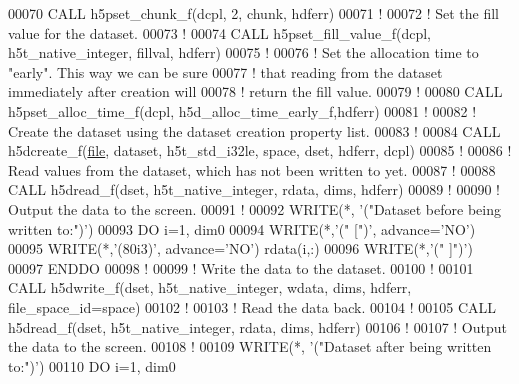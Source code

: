 \begin{DoxyCode}
00070   \textcolor{keyword}{CALL }h5pset\_chunk\_f(dcpl, 2, chunk, hdferr)
00071   \textcolor{comment}{!}
00072   \textcolor{comment}{! Set the fill value for the dataset.}
00073   \textcolor{comment}{!}
00074   \textcolor{keyword}{CALL }h5pset\_fill\_value\_f(dcpl, h5t\_native\_integer, fillval, hdferr)
00075   \textcolor{comment}{!}
00076   \textcolor{comment}{! Set the allocation time to "early".  This way we can be sure}
00077   \textcolor{comment}{! that reading from the dataset immediately after creation will}
00078   \textcolor{comment}{! return the fill value.}
00079   \textcolor{comment}{!}
00080   \textcolor{keyword}{CALL }h5pset\_alloc\_time\_f(dcpl, h5d\_alloc\_time\_early\_f,hdferr)
00081   \textcolor{comment}{!}
00082   \textcolor{comment}{! Create the dataset using the dataset creation property list.}
00083   \textcolor{comment}{!}
00084   \textcolor{keyword}{CALL }h5dcreate\_f(\hyperlink{structfile}{file}, dataset, h5t\_std\_i32le, space, dset, hdferr, dcpl)
00085   \textcolor{comment}{!}
00086   \textcolor{comment}{! Read values from the dataset, which has not been written to yet.}
00087   \textcolor{comment}{!}
00088   \textcolor{keyword}{CALL }h5dread\_f(dset, h5t\_native\_integer, rdata, dims, hdferr)
00089   \textcolor{comment}{!}
00090   \textcolor{comment}{! Output the data to the screen.}
00091   \textcolor{comment}{!}
00092   \textcolor{keyword}{WRITE}(*, \textcolor{stringliteral}{'("Dataset before being written to:")'})
00093   \textcolor{keywordflow}{DO} i=1, dim0
00094      \textcolor{keyword}{WRITE}(*,\textcolor{stringliteral}{'(" [")'}, advance=\textcolor{stringliteral}{'NO'})
00095      \textcolor{keyword}{WRITE}(*,\textcolor{stringliteral}{'(80i3)'}, advance=\textcolor{stringliteral}{'NO'}) rdata(i,:)
00096      \textcolor{keyword}{WRITE}(*,\textcolor{stringliteral}{'(" ]")'})
00097 \textcolor{keywordflow}{  ENDDO}
00098   \textcolor{comment}{!}
00099   \textcolor{comment}{! Write the data to the dataset.}
00100   \textcolor{comment}{!}
00101   \textcolor{keyword}{CALL }h5dwrite\_f(dset, h5t\_native\_integer, wdata, dims, hdferr, file\_space\_id=space)
00102   \textcolor{comment}{!}
00103   \textcolor{comment}{! Read the data back.}
00104   \textcolor{comment}{!}
00105   \textcolor{keyword}{CALL }h5dread\_f(dset, h5t\_native\_integer, rdata, dims, hdferr)
00106   \textcolor{comment}{!}
00107   \textcolor{comment}{! Output the data to the screen.}
00108   \textcolor{comment}{!}
00109   \textcolor{keyword}{WRITE}(*, \textcolor{stringliteral}{'("Dataset after being written to:")'})
00110   \textcolor{keywordflow}{DO} i=1, dim0

\end{DoxyCode}
